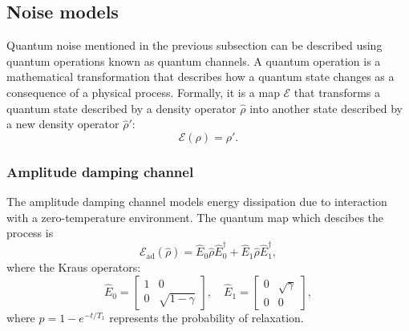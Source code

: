 \subsection{Noise models}
Quantum noise mentioned in the previous subsection can be described using quantum operations known as quantum channels. 
A quantum operation is a mathematical transformation that describes how a quantum state changes as a consequence of a physical process. 
Formally, it is a map $\mathcal{E}$ that transforms a quantum state described by a density operator $\hat{\rho}$ into another state described by a new density operator $\hat{\rho}'$:
\begin{equation}
    \mathcal{E}(\rho) = \rho'\label{eq:quantum_map}.
\end{equation}

\subsubsection{Amplitude damping channel}
The amplitude damping channel models energy dissipation due to interaction with a zero-temperature environment. The quantum map which descibes the process is 
\begin{equation}\label{eq:amplitude_damping}
    \mathcal{E}_{\text{ad}}(\hat{\rho}) = \hat{E}_0 \hat{\rho} \hat{E}_0^{\dagger} + \hat{E}_1 \hat{\rho} \hat{E}_1^{\dagger},
\end{equation}
where the Kraus operators:
\begin{equation}
    \hat{E}_0 = \begin{bmatrix} 1 & 0 \\ 0 & \sqrt{1 - \gamma} \end{bmatrix}, \quad
    \hat{E}_1 = \begin{bmatrix} 0 & \sqrt{\gamma} \\ 0 & 0 \end{bmatrix},
\end{equation}
where $p = 1 - e^{-t/T_1}$ represents the probability of relaxation.


